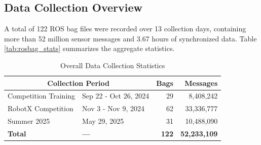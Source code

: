 \documentclass{erauthesis}
\begin{document}



\subsection{Data Collection Overview}
\label{sec:data_overview}

A total of 122 ROS bag files were recorded over 13 collection days, 
containing more than 52 million sensor messages and 3.67 hours of synchronized data.  
Table \ref{tab:rosbag_stats} summarizes the aggregate statistics.  


\begin{table}[h]
\centering
\caption{Overall Data Collection Statistics}
\label{tab:rosbag_stats}
\begin{tabular}{llrr}
\hline
\multicolumn{2}{c}{Collection Period} & Bags & Messages \\
\hline
\hline
Competition Training & Sep 22 - Oct 26, 2024 & 29 & 8,408,242 \\
RobotX Competition & Nov 3 - Nov 9, 2024 & 62 & 33,336,777 \\
Summer 2025  & May 29, 2025 & 31 & 10,488,090 \\
\hline
\textbf{Total} & \textbf{---} & \textbf{122} & \textbf{52,233,109} \\
\hline
\end{tabular}
\label{tab:collection_periods}
\end{table}
\end{document}
